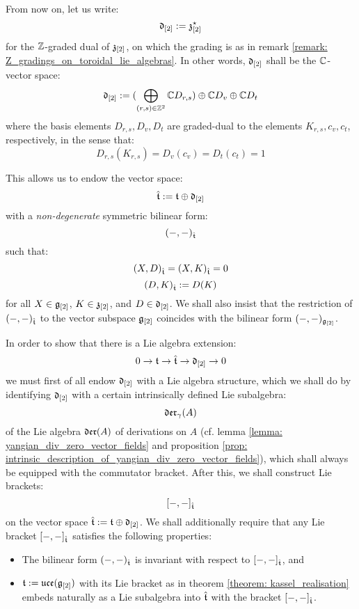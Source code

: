         \begin{convention} \label{conv: orthogonal_complement_of_toroidal_centres}
            From now on, let us write:
                $$\mathfrak{d}_{[2]} := \mathfrak{z}_{[2]}^{\star}$$
            for the $\mathbb{Z}$-graded dual of $\mathfrak{z}_{[2]}$, on which the grading is as in remark \ref{remark: Z_gradings_on_toroidal_lie_algebras}. In other words, $\mathfrak{d}_{[2]}$ shall be the $\mathbb{C}$-vector space:
                $$\mathfrak{d}_{[2]} := ( \bigoplus_{(r, s) \in \mathbb{Z}^2} \mathbb{C} D_{r, s} ) \oplus \mathbb{C} D_v \oplus \mathbb{C} D_t$$
            where the basis elements $D_{r, s}, D_v, D_t$ are graded-dual to the elements $K_{r, s}, c_v, c_t$, respectively, in the sense that:
                $$D_{r, s}(K_{r, s}) = D_v(c_v) = D_t(c_t) = 1$$

            This allows us to endow the vector space:
                $$\hat{\mathfrak{t}} := \mathfrak{t} \oplus \mathfrak{d}_{[2]}$$
            with a \textit{non-degenerate} symmetric bilinear form:
                $$(-, -)_{\hat{\mathfrak{t}}}$$
            such that:
                $$(X, D)_{\hat{\mathfrak{t}}} = (X, K)_{\hat{\mathfrak{t}}} = 0$$
                $$(D, K)_{\hat{\mathfrak{t}}} := D(K)$$
            for all $X \in \mathfrak{g}_{[2]}$, $K \in \mathfrak{z}_{[2]}$, and $D \in \mathfrak{d}_{[2]}$. We shall also insist that the restriction of $(-, -)_{\hat{\mathfrak{t}}}$ to the vector subspace $\mathfrak{g}_{[2]}$ coincides with the bilinear form $(-, -)_{\mathfrak{g}_{[2]}}$.
        \end{convention}

        In order to show that there is a Lie algebra extension:
            $$0 \to \mathfrak{t} \to \hat{\mathfrak{t}} \to \mathfrak{d}_{[2]} \to 0$$
        we must first of all endow $\mathfrak{d}_{[2]}$ with a Lie algebra structure, which we shall do by identifying $\mathfrak{d}_{[2]}$ with a certain intrinsically defined Lie subalgebra:
            $$\mathfrak{der}_{\gamma}(A)$$
        of the Lie algebra $\mathfrak{der}(A)$ of derivations on $A$ (cf. lemma \ref{lemma: yangian_div_zero_vector_fields} and proposition \ref{prop: intrinsic_description_of_yangian_div_zero_vector_fields}), which shall always be equipped with the commutator bracket. After this, we shall construct Lie brackets:
            $$[-, -]_{\hat{\mathfrak{t}}}$$
        on the vector space $\hat{\mathfrak{t}} := \mathfrak{t} \oplus \mathfrak{d}_{[2]}$. We shall additionally require that any Lie bracket $[-, -]_{\hat{\mathfrak{t}}}$ satisfies the following properties:
        \begin{itemize}
            \item The bilinear form $(-, -)_{\hat{\mathfrak{t}}}$ is invariant with respect to $[-, -]_{\hat{\mathfrak{t}}}$, and
            \item $\mathfrak{t} := \mathfrak{uce}(\mathfrak{g}_{[2]})$ with its Lie bracket as in theorem \ref{theorem: kassel_realisation} embeds naturally as a Lie subalgebra into $\hat{\mathfrak{t}}$ with the bracket $[-, -]_{\hat{\mathfrak{t}}}$. 
        \end{itemize}

